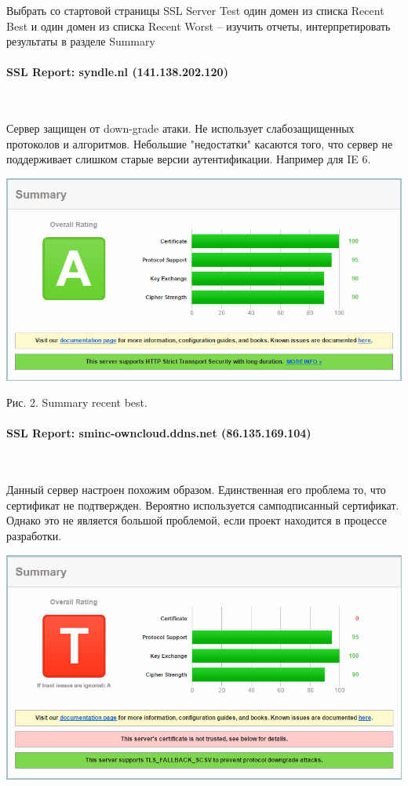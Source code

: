 \documentclass{article}
\begin{document}
Выбрать со стартовой страницы SSL Server Test один домен из списка Recent Best и один домен из списка Recent Worst – изучить отчеты, интерпретировать результаты в разделе Summary

\paragraph{SSL Report: syndle.nl (141.138.202.120)}
~

Сервер защищен от down-grade атаки. Не использует слабозащищенных протоколов и алгоритмов. Небольшие "недостатки" касаются того, что сервер не поддерживает слишком старые версии аутентификации. Например для IE 6.

\includegraphics[width=\linewidth]{good}
\begin{center}
Рис. 2. Summary recent best.
\end{center}

\paragraph{SSL Report: sminc-owncloud.ddns.net (86.135.169.104)}
~

Данный сервер настроен похожим образом. Единственная его проблема то, что сертификат не подтвержден. Вероятно используется самподписанный сертификат. Однако это не является большой проблемой, если проект находится в процессе разработки.

\begin{center}
\includegraphics[scale=0.7]{bad}
\end{center}
\end{document}
